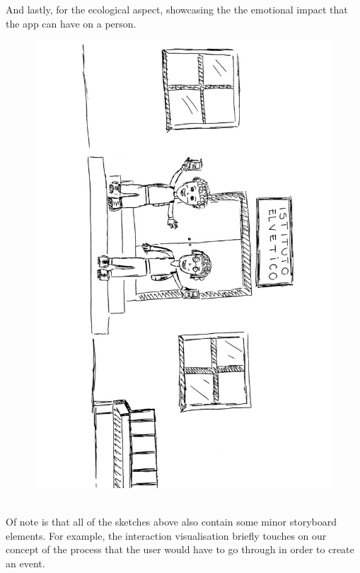 \documentclass[12pt]{report}
\begin{document}
	And lastly, for the ecological aspect, showcasing the the emotional impact that the app can have on a person.\\
  \begin{figure}
		\centering
	\includegraphics[scale=0.29]{Ecological.jpg}
	\end{figure}
	\\
	Of note is that all of the sketches above also contain some minor storyboard elements. For example, the interaction visualisation briefly touches on our concept of the process that the user would have to go through in order to create an event.
	\newpage
\end{document}
